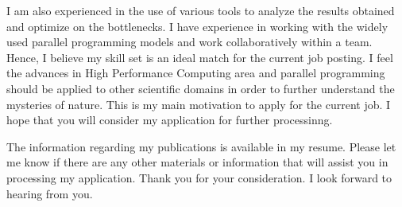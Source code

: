 \documentclass[10pt,stdletter,dateno]{newlfm}
\begin{document}
\begin{newlfm}
	   I am also experienced in the use of various tools to analyze the results obtained and optimize on the bottlenecks.
	   I have experience in working with the widely used parallel programming models and work collaboratively within a team.
	   Hence, I believe my skill set is an ideal match for the current job posting. 
	   I feel the advances in High Performance Computing area and parallel programming should be applied to other scientific domains in order to further understand the mysteries of nature.
	   This is my main motivation to apply for the current job. 
	   I hope that you will consider my application for further processinng. 
%
	   \par
	   The information regarding my publications is available in my resume.
	   Please let me know if there are any other materials or information that will assist you in processing my application.
	   Thank you for your consideration. I look forward to hearing from you.
%
\end{newlfm}
\end{document}

